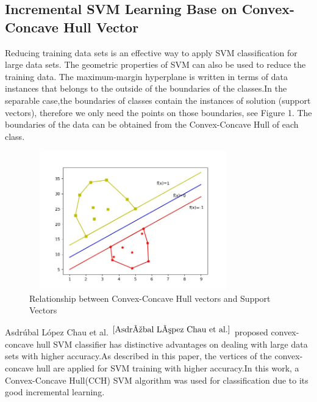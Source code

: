 \documentclass[a4paper]{article}
\begin{document}
\subsection{Incremental SVM Learning Base on Convex-Concave Hull Vector}
Reducing training data sets is an effective way to apply SVM classification for large data sets. The geometric properties of SVM can also be used to reduce the training data. The maximum-margin hyperplane is written in terms of data instances that belongs to the outside of the boundaries of the classes.In the separable case,the boundaries of classes contain the instances of solution (support vectors), therefore we only need the points on those boundaries, see Figure 1. The boundaries of the data can be obtained from the Convex-Concave Hull of each class.




\begin{figure}[h]
  \centering
  \includegraphics[width=9cm,height=6cm]{HullVector_SupportVector}
  \caption{Relationship between Convex-Concave Hull vectors and Support Vectors}
\end{figure}
Asdrúbal López Chau et al. $ ^{\cite{Asdrúbal López Chau et al.}}$ proposed convex-concave hull SVM classiﬁer has distinctive advantages on dealing with large data sets with higher accuracy.As described in this paper, the vertices of the convex-concave hull are applied for SVM training with higher accuracy.In this work, a Convex-Concave Hull(CCH) SVM algorithm was used for classification due to its good incremental learning.
\end{document}
